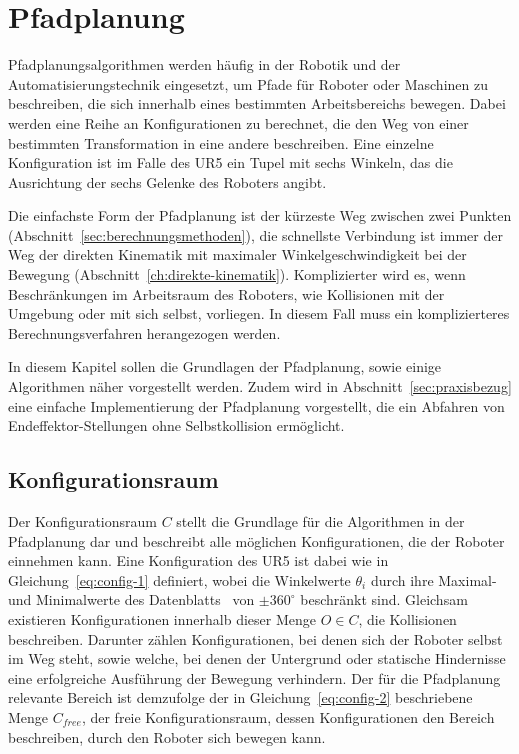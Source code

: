 \cleardoublepage


\chapter{Pfadplanung}\label{ch:pfadplanung}

Pfadplanungsalgorithmen werden häufig in der Robotik und der Automatisierungstechnik eingesetzt, um Pfade für Roboter oder Maschinen zu beschreiben, die sich innerhalb eines bestimmten Arbeitsbereichs bewegen.
Dabei werden eine Reihe an Konfigurationen zu berechnet, die den Weg von einer bestimmten Transformation in eine andere beschreiben.
Eine einzelne Konfiguration ist im Falle des UR5 ein Tupel mit sechs Winkeln, das die Ausrichtung der sechs Gelenke des Roboters angibt.

Die einfachste Form der Pfadplanung ist der kürzeste Weg zwischen zwei Punkten (Abschnitt~\ref{sec:berechnungsmethoden}), die schnellste Verbindung ist immer der Weg der direkten Kinematik mit maximaler Winkelgeschwindigkeit bei der Bewegung (Abschnitt~\ref{ch:direkte-kinematik}).
Komplizierter wird es, wenn Beschränkungen im Arbeitsraum des Roboters, wie Kollisionen mit der Umgebung oder mit sich selbst, vorliegen.
In diesem Fall muss ein komplizierteres Berechnungsverfahren herangezogen werden.

In diesem Kapitel sollen die Grundlagen der Pfadplanung, sowie einige Algorithmen näher vorgestellt werden.
Zudem wird in Abschnitt~\ref{sec:praxisbezug} eine einfache Implementierung der Pfadplanung vorgestellt, die ein Abfahren von Endeffektor-Stellungen ohne Selbstkollision ermöglicht.


\section{Konfigurationsraum}\label{sec:konfigurationsraum}

Der Konfigurationsraum $\mathit{C}$ stellt die Grundlage für die Algorithmen in der Pfadplanung dar und beschreibt alle möglichen Konfigurationen, die der Roboter einnehmen kann.
Eine Konfiguration des UR5 ist dabei wie in Gleichung~\ref{eq:config-1} definiert, wobei die Winkelwerte $\theta_i$ durch ihre Maximal- und Minimalwerte des Datenblatts~\cite{universalrobotsUR5TechnicalSpecifications} von $\pm 360^{\circ}$ beschränkt sind.
Gleichsam existieren Konfigurationen innerhalb dieser Menge $\mathit{O}\in\mathit{C}$, die Kollisionen beschreiben.
Darunter zählen Konfigurationen, bei denen sich der Roboter selbst im Weg steht, sowie welche, bei denen der Untergrund oder statische Hindernisse eine erfolgreiche Ausführung der Bewegung verhindern.
Der für die Pfadplanung relevante Bereich ist demzufolge der in Gleichung~\ref{eq:config-2} beschriebene Menge $\mathit{C}_{free}$, der freie Konfigurationsraum, dessen Konfigurationen den Bereich beschreiben, durch den Roboter sich bewegen kann.


